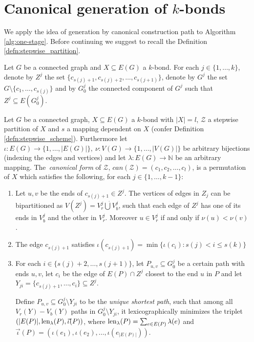 \clearpage

\section{Canonical generation of $k$-bonds}

We apply the idea of generation by canonical construction path to Algorithm \ref{alg:one-stage}. Before continuing we suggest to recall the Definition \ref{defn:stepwise_partition}.

Let $G$ be a connected graph and $X \subseteq E(G)$ a $k$-bond. For each \break $j \in \{1, \ldots, k\}$, denote by $Z^j$ the set $\{c_{s(j)+1}, c_{s(j)+2}, \ldots, c_{s(j+1)}\}$, denote by $G^j$ the set $G \setminus \{c_{1}, \ldots, c_{s(j)}\}$ and by $G^j_0$ the connected component of $G^j$ such that $Z^j \subseteq E(G^j_0)$.

\begin{defn}
	\label{can}

	Let $G$ be a connected graph, $X \subseteq E(G)$ a $k$-bond with $\lvert X \rvert = l$, $\mathcal{Z}$ a stepwise partition of $X$ and $s$ a mapping dependent on $X$ (confer Definition \ref{defn:stepwise_scheme}). Furthermore let
	$\iota : E(G) \rightarrow \{1,\ldots,\lvert E(G) \rvert\}, \> \nu : V(G) \rightarrow \{1,\ldots,\lvert V(G) \rvert\}$ be arbitrary bijections (indexing the edges and vertices) and let $\lambda : E(G) \rightarrow \mathbb{N}$ be an arbitrary mapping. The~\textit{canonical form} of $\mathcal{Z}$, $can(\mathcal{Z}) = (c_1, c_2,\ldots, c_l)$, is a permutation of $X$ which satisfies the following, for each $j \in \{1,\ldots,k-1\}$:

	\begin{enumerate}[label=\alph*.]
		\item Let $u,v$ be the ends of $c_{s(j)+1} \in Z^j$. The vertices of edges in $Z_j$ can be bipartitioned as $V(Z^j) = V^j_r \dot\bigcup V^j_b$, such that each edge of $Z^j$ has one of its ends in $V_b^j$ and the other in $V_r^j$. Moreover $u \in V_r^j$ if and only if $\nu(u) < \nu(v)$.

		\item The edge $c_{s(j)+1}$ satisfies ${\iota(c_{s(j)+1}) = \min\{ \iota(c_i) : s(j) < i \leq s(k) \}}$

	\item For each $i \in \{s(j) + 2,\ldots, s(j+1)\}$,
		let $P_{u,v} \subseteq G^j_0$ be a certain path with ends $u,v$,
		let $c_i$ be the edge of $E(P) \cap Z^j$ closest to the end $u$ in $P$ and let
		$Y_{ji} = \{c_{s(j)+1}, \ldots, c_i\} \subseteq Z^j$.

		Define $P_{u,v} \subseteq G_0^j \setminus Y_{ji}$ to be the \textit{unique shortest path}, such that among all $V_r(Y){-}V_b(Y)$ paths in $G^j_0 \setminus Y_{ji}$, it lexicographically minimizes the triplet
	$(\lvert E(P) \rvert, \operatorname{len}_\lambda(P), \vec{\iota}(P) )$, where $\operatorname{len}_\lambda(P) = \sum_{e \in E(P)} \lambda(e)$ and $\vec{\iota}(P) = (\iota(e_1), \iota(e_2),\ldots, \iota(e_{\lvert E(P) \rvert}))$.

	\end{enumerate}

\end{defn}


